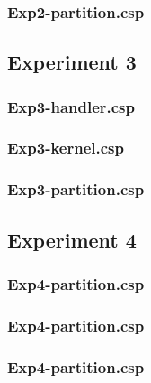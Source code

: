 \newpage
\subsubsection{Exp2-partition.csp}


\newpage
\subsection{Experiment 3}

\subsubsection{Exp3-handler.csp}


\newpage
\subsubsection{Exp3-kernel.csp}


\newpage
\subsubsection{Exp3-partition.csp}


\newpage
\subsection{Experiment 4}

\subsubsection{Exp4-partition.csp}


\newpage
\subsubsection{Exp4-partition.csp}


\newpage
\subsubsection{Exp4-partition.csp}

